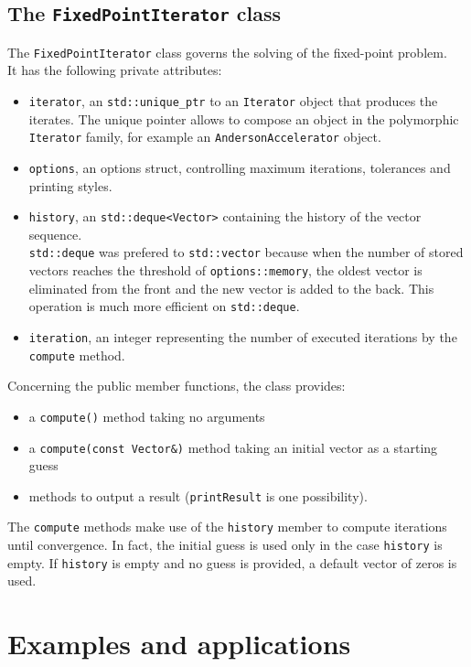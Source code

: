 \documentclass[12pt]{article}
\begin{document}
		
		\subsection {The \texttt{FixedPointIterator} class}
		The \texttt{FixedPointIterator} class governs the solving of the fixed-point problem.\\
		It has the following private attributes:
		\begin{itemize}
		\item \verb|iterator|, an \verb|std::unique_ptr| to an \verb|Iterator| object that produces the iterates. The unique pointer
		allows to compose an object in the polymorphic \verb|Iterator| family, for example an \verb|AndersonAccelerator| object.
		\item \verb|options|, an options struct, controlling maximum iterations, tolerances and printing styles.
		\item \verb|history|, an \verb|std::deque<Vector>| containing the history of the vector sequence.\\
		\verb|std::deque| was prefered to \verb|std::vector| because when the number of stored vectors reaches the threshold
		of \verb|options::memory|, the oldest vector is eliminated from the front and the new vector is added to the back.
		This operation is much more efficient on \verb|std::deque|.
		\item \verb|iteration|, an integer representing the number of executed iterations by the \verb|compute| method.
		\end{itemize}
		
		Concerning the public member functions, the class  provides:
		\begin{itemize}
		\item a \verb|compute()| method taking no arguments
		\item a \verb|compute(const Vector&)| method taking an initial vector as a starting guess
		\item  methods to output a result (\verb|printResult| is one possibility).
		\end{itemize}
		The \verb|compute| methods make use of the \verb|history| member to compute iterations until
		convergence. In fact, the initial guess is used only in the case \verb|history| is empty. If \verb|history| is empty
		and no guess is provided, a default vector of zeros is used.\\
		
		\section{Examples and applications}
		
\end{document}
